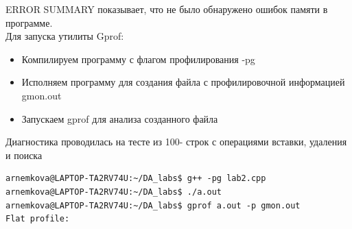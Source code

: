 \documentclass[12pt]{article}
\begin{document}
ERROR SUMMARY показывает, что не было обнаружено ошибок памяти в программе.\\

Для запуска утилиты Gprof:

\begin{itemize}
    \item Компилируем программу с флагом профилирования -pg
    \item Исполняем программу для создания файла с профилировочной информацией gmon.out
    \item Запускаем gprof для анализа созданного файла
\end{itemize}

Диагностика проводилась на тесте из 100- строк с операциями вставки, удаления и поиска

\begin{Verbatim}[fontsize=\footnotesize,breaklines=true]
arnemkova@LAPTOP-TA2RV74U:~/DA_labs$ g++ -pg lab2.cpp
arnemkova@LAPTOP-TA2RV74U:~/DA_labs$ ./a.out
arnemkova@LAPTOP-TA2RV74U:~/DA_labs$ gprof a.out -p gmon.out
Flat profile:


\end{Verbatim}
\end{document}
